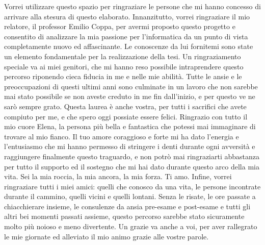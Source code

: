 \documentclass[Lau, oneside]{sapthesis}%
\begin{document}
\begin{acknowledgments}
Vorrei utilizzare questo spazio per ringraziare le persone che mi hanno concesso di arrivare alla stesura di questo elaborato.
\newline \newline
Innanzitutto, vorrei ringraziare il mio relatore, il professor Emilio Coppa, per avermi proposto questo progetto e consentito di analizzare la mia passione per l'informatica da un punto di vista completamente nuovo ed affascinante. 
\newline
Le conoscenze da lui fornitemi sono state un elemento fondamentale per la realizzazione della tesi.
\newline \newline
Un ringraziamento speciale va ai miei genitori, che mi hanno reso possibile intraprendere questo percorso riponendo cieca fiducia in me e nelle mie abilità.
\newline
Tutte le ansie e le preoccupazioni di questi ultimi anni sono culminate in un lavoro che non sarebbe mai stato possibile se non aveste creduto in me fin dall'inizio, e per questo ve ne sarò sempre grato.
\newline
Questa laurea è anche vostra, per tutti i sacrifici che avete compiuto per me, e che spero oggi possiate essere felici.
\newline \newline
Ringrazio con tutto il mio cuore Elena, la persona più bella e fantastica che potessi mai immaginare di trovare al mio fianco.
\newline
Il tuo amore coraggioso e forte mi ha dato l’energia e l’entusiasmo che mi hanno permesso di stringere i denti durante ogni avversità e raggiungere finalmente questo traguardo, e non potrò mai ringraziarti abbastanza per tutto il supporto ed il sostegno che mi hai dato durante questo arco della mia vita.
\newline
Sei la mia roccia, la mia ancora, la mia forza. Ti amo.
\newline \newline
Infine, vorrei ringraziare tutti i miei amici: quelli che conosco da una vita, le persone incontrate durante il cammino, quelli vicini e quelli lontani.
\newline
Senza le risate, le ore passate a chiacchierare insieme, le consulenze da ansia pre-esame e post-esame e tutti gli altri bei momenti passati assieme, questo percorso sarebbe stato sicuramente molto più noioso e meno divertente.
\newline
Un grazie va anche a voi, per aver rallegrato le mie giornate ed alleviato il mio animo grazie alle vostre parole.
\end{acknowledgments}
\end{document}
